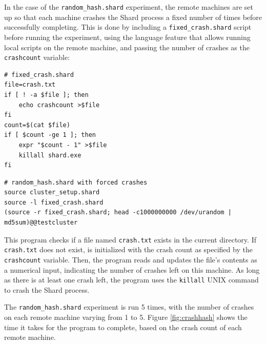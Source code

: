 \documentclass[twoside]{report}
\begin{document}
In the case of the \texttt{random\_hash.shard} experiment, the remote machines are set up so that each machine crashes the Shard process a fixed number of times before successfully completing.
This is done by including a \texttt{fixed\_crash.shard} script before running the experiment, using the language feature that allows running local scripts on the remote machine, and passing the number of crashes as the \texttt{crashcount} variable:

\begin{minipage}[c]{\textwidth-15pt}
  \begin{lstlisting}[language=Shard]
# fixed_crash.shard
file=crash.txt
if [ ! -a $file ]; then
    echo crashcount >$file
fi
count=$(cat $file)
if [ $count -ge 1 ]; then
    expr "$count - 1" >$file
    killall shard.exe
fi
\end{lstlisting}
  \smallskip
\end{minipage}

\begin{minipage}[c]{\textwidth-15pt}
  \begin{lstlisting}[language=Shard]
# random_hash.shard with forced crashes
source cluster_setup.shard
source -l fixed_crash.shard
(source -r fixed_crash.shard; head -c1000000000 /dev/urandom | md5sum)@@testcluster
\end{lstlisting}
  \smallskip
\end{minipage}

This program checks if a file named \texttt{crash.txt} exists in the current directory.
If \texttt{crash.txt} does not exist, is initialized with the crash count as specified by the \texttt{crashcount} variable.
Then, the program reads and updates the file's contents as a numerical input, indicating the number of crashes left on this machine.
As long as there is at least one crash left, the program uses the \texttt{killall} UNIX command to crash the Shard process.

The \texttt{random\_hash.shard} experiment is run 5 times, with the number of crashes on each remote machine varying from 1 to 5.
Figure \ref{fig:crashhash} shows the time it takes for the program to complete, based on the crash count of each remote machine.
\end{document}
